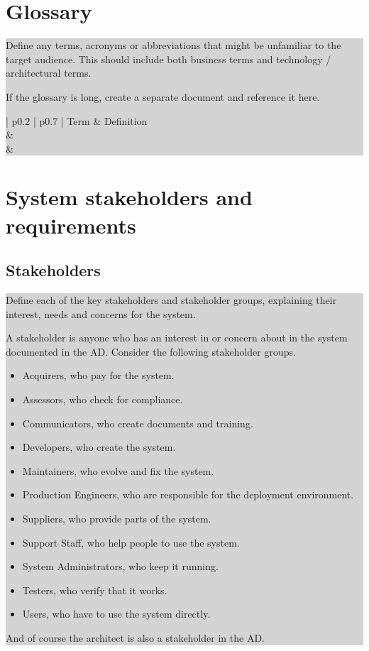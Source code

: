 \documentclass[a4paper,11pt]{report}
\newcommand{\instructions}[1]{
  \noindent\colorbox{lightgray}{%
    \parbox{\linewidth}{%
      #1
    }%
  }%
 \vspace{0.1cm}
}
\begin{document}
\chapter{Glossary}
\label{cha:glossary}
\thispagestyle{fancy}
\instructions{
  Define any terms, acronyms or abbreviations that might be unfamiliar
  to the target audience. This should include both business terms and
  technology / architectural terms.

  If the glossary is long, create a separate document and reference it here.

\begin{center}
  \begin{tabular}[h!]{| p{0.2\textwidth} | p{0.7\textwidth} |}
    \hline
    \rowcolor{gray}
    Term & Definition \\
    \hline
    \hline
    & \\
    \hline
    & \\
    \hline
  \end{tabular}
\end{center}
}

\chapter{System stakeholders and requirements}
\label{cha:syst-stak-requ}
\thispagestyle{fancy}

\section{Stakeholders}
\label{sec:stakeholders}

\instructions{
  Define each of the key stakeholders and stakeholder groups, explaining
  their interest, needs and concerns for the system.

  A stakeholder is anyone who has an interest in or concern about in the
  system documented in the AD. Consider the following stakeholder
  groups.

  \begin{itemize}
  \item Acquirers, who pay for the system.
  \item Assessors, who check for
    compliance.
  \item Communicators, who create documents and training.
  \item Developers, who create the system.
  \item Maintainers, who evolve and
    fix the system.
  \item Production Engineers, who are responsible for the
    deployment environment.
  \item Suppliers, who provide parts of the
    system.
  \item Support Staff, who help people to use the system.
  \item System Administrators, who keep it running.
  \item Testers, who verify
    that it works.
  \item Users, who have to use the system directly.
  \end{itemize}
  And of course the architect is also a stakeholder in the AD.
}
\end{document}

